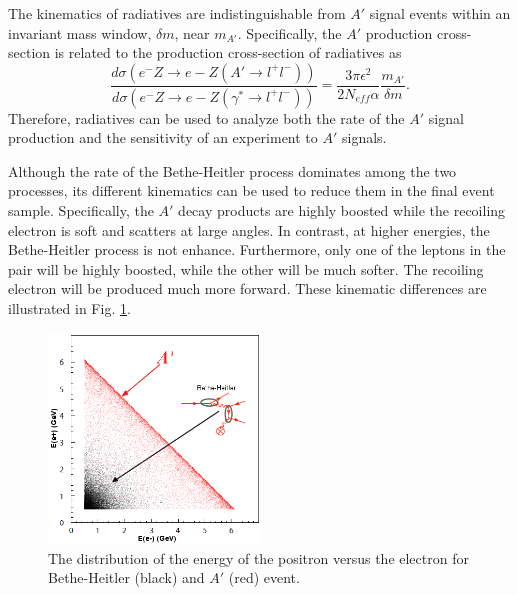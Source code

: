 The kinematics of radiatives are indistinguishable from $A'$ signal events 
within an invariant mass window, $\delta m$, near $m_{A'}$. Specifically, 
the $A'$ production cross-section is related to the production cross-section of 
radiatives as 
\begin{equation}
    \frac{d\sigma(e^-Z\rightarrow e-Z(A'\rightarrow l^+l^-))}
    {d\sigma(e^-Z\rightarrow e-Z(\gamma^*\rightarrow l^+l^-))}
    = \frac{3\pi\epsilon^{2}}{2 N_{eff} \alpha} \frac{m_{A'}}{\delta m}.
\end{equation}
Therefore, radiatives can be used to analyze both the rate of the $A'$ signal 
production and the sensitivity of an experiment to $A'$ signals.

Although the rate of the Bethe-Heitler process dominates among the two 
processes, its different kinematics can be used to reduce them in the final 
event sample.  Specifically, the $A'$ decay products are highly boosted while 
the recoiling electron is soft and scatters at large angles.  In contrast, 
at higher energies, the Bethe-Heitler process is not enhance.  Furthermore,
only one of the leptons in the pair will be highly boosted, while the other
will be much softer.  The recoiling electron will be produced much more forward.
These kinematic differences are illustrated in Fig. \ref{fig:ap_v_bethe}.
\begin{figure}[t]
    \centering
    \includegraphics[width=0.5\textwidth]{images/bh_energy_cut.png}
    \caption{The distribution of the energy of the positron versus the electron
    for Bethe-Heitler (black) and $A'$ (red) event.}
    \label{fig:ap_v_bethe}
\end{figure}


